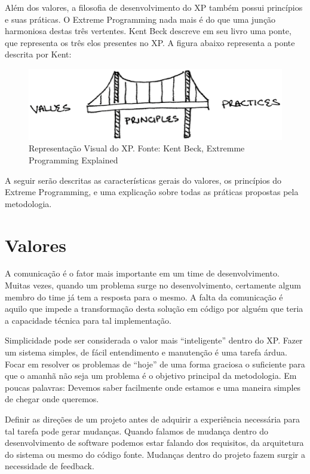 Além dos valores, a filosofia de desenvolvimento do XP também possui princípios e suas práticas. O Extreme Programming nada mais é do que uma junção harmoniosa destas três vertentes. Kent Beck descreve em seu livro uma ponte, que representa os três elos presentes no XP. A figura abaixo representa a ponte descrita por Kent:

\begin{figure}[h]
	\centering
	\label{fig02}
		\includegraphics[keepaspectratio=true,scale=0.6]{figuras/fig02.eps}
	\caption{Representação Visual do XP. Fonte: Kent Beck, Extremme Programming Explained}
\end{figure}

A seguir serão descritas as características gerais do valores, os princípios do Extreme Programming, e uma explicação sobre todas as práticas propostas pela metodologia.

\section{Valores}

A comunicação é o fator mais importante em um time de desenvolvimento. Muitas vezes, quando um problema surge no desenvolvimento, certamente algum membro do time já tem a resposta para o mesmo. A falta da comunicação é aquilo que impede a transformação desta solução em código por alguém que teria a capacidade técnica para tal implementação.

Simplicidade pode ser considerada o valor mais “inteligente” dentro do XP. Fazer um sistema simples, de fácil entendimento e manutenção é uma tarefa árdua. Focar em resolver os problemas de “hoje” de uma forma graciosa o suficiente para que o amanhã não seja um problema é o objetivo principal da metodologia. Em poucas palavras: Devemos saber facilmente onde estamos e uma maneira simples de chegar onde queremos.

Definir as direções de um projeto antes de adquirir a experiência necessária para tal tarefa pode gerar mudanças. Quando falamos de mudança dentro do desenvolvimento de software podemos estar falando dos requisitos, da arquitetura do sistema ou mesmo do código fonte. Mudanças dentro do projeto fazem surgir a necessidade de feedback.

